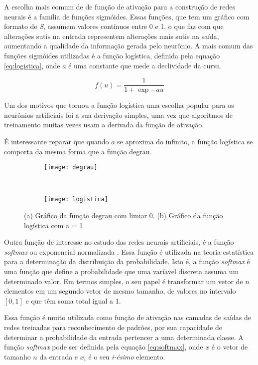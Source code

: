 A escolha mais comum de de função de ativação para a construção de redes neurais é a família de funções sigmóides. Essas funções, que tem um gráfico com formato de \textit{S}, assumem valores contínuos entre 0 e 1, o que faz com que alterações sutis na entrada representem alterações mais sutis na saída, aumentando a qualidade da informação gerada pelo neurônio. A mais comum das funções sigmóides utilizadas é a função logística, definida pela equação \ref{eq:logistica}, onde $a$ é uma constante que mede a declividade da curva.

\begin{equation}
	f(u) = \frac{1}{1 + \exp{-au}}
\label{eq:logistica}
\end{equation}

Um dos motivos que tornou a função logística uma escolha popular para os neurônios artificiais foi a sua derivação simples, uma vez que algoritmos de treinamento muitas vezes usam a derivada da função de ativação\cite{Kosabov}.

É interessante reparar que quando $a$ se aproxima do infinito, a função logística se comporta da mesma forma que a função degrau.

\begin{figure}
 \centering
\begin{subfigure}{.5\textwidth}
  \centering
  \texttt{[image: degrau]}
	\caption{}
	\label{fig:ativacao:sub:degrau}
\end{subfigure}\
\begin{subfigure}{.5\textwidth}
  \centering
  \texttt{[image: logistica]}
	\caption{}
	\label{fig:ativacao:sub:logistica}
\end{subfigure}
\caption{(a) Gráfico da função degrau com limiar 0. (b) Gráfico da função logística com a = 1}
\label{fig:ativacao}
\end{figure}

Outra função de interesse no estudo das redes neurais artificiais, é a função \textit{softmax} ou exponencial normalizada \cite{bishop2006pattern}. Essa função é utilizada na teoria estatística para a determinação da distribuição da probabilidade. Isto é, a função \textit{softmax} é uma função que define a probabilidade que uma varíavel discreta assuma um determinado valor\cite{altmanbs}. Em termos simples, o seu papel é transformar um vetor de $n$ elementos em um segundo vetor de mesmo tamanho, de valores no intervalo $[0,1]$ e que têm soma total igual a $1$.

Essa função é muito utilizada como função de ativação nas camadas de saídas de redes treinadas para reconhecimento de padrões, por sua capacidade de determinar a probabilidade da entrada pertencer a uma determinada classe. A função \textit{softmax} pode ser definida pela equação \ref{eq:softmax}, onde $x$ é o vetor de tamanho $n$ da entrada e $x_i$ é o seu \textit{i-ésimo} elemento.

